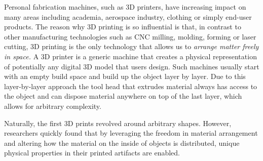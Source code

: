 Personal fabrication machines, such as 3D printers, have increasing impact on many areas including academia, aerospace industry, clothing or simply end-user products. The reason why 3D printing is so influential is that, in contrast to other manufacturing technologies such as CNC milling, molding, forming or laser cutting, 3D printing is the only technology that allows us to \textit{arrange matter freely in space.} A 3D printer is a generic machine that creates a physical representation of potentially any digital 3D model that users design. Such machines usually start with an empty build space and build up the object layer by layer. Due to this layer-by-layer approach the tool head that extrudes material always has access to the object and can dispose material anywhere on top of the last layer, which allows for arbitrary complexity. 

Naturally, the first 3D prints revolved around arbitrary shapes. However, researchers quickly found that by leveraging the freedom in material arrangement and altering how the material on the inside of objects is distributed, unique physical properties in their printed artifacts are enabled.





